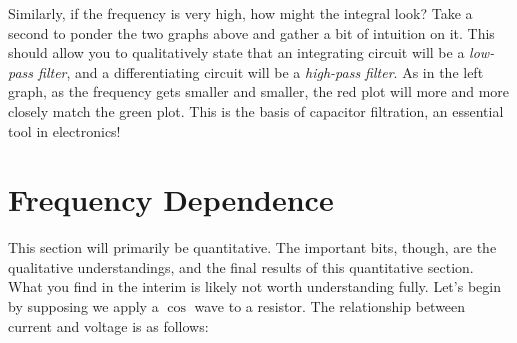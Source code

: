 \documentclass[12pt]{report}
\begin{document}
\begin{multicols}{2}

\end{multicols}

Similarly, if the frequency is very high, how might the integral look? Take a second to ponder the two graphs above and gather a bit of intuition on it. This should allow you to qualitatively state that an integrating circuit will be a \textit{low-pass filter}, and a differentiating circuit will be a \textit{high-pass filter}. As in the left graph, as the frequency gets smaller and smaller, the red plot will more and more closely match the green plot. This is the basis of capacitor filtration, an essential tool in electronics!

\section{Frequency Dependence}
This section will primarily be quantitative. The important bits, though, are the qualitative understandings, and the final results of this quantitative section. What you find in the interim is likely not worth understanding fully. Let's begin by supposing we apply a $\cos$ wave to a resistor. The relationship between current and voltage is as follows:
\end{document}
